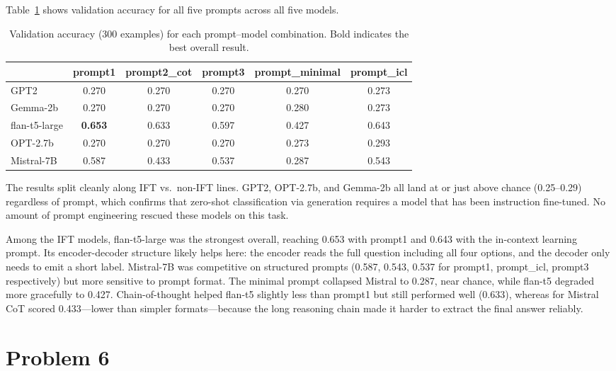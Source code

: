 \documentclass[11pt]{article}
\begin{document}
Table~\ref{tab:results} shows validation accuracy for all five prompts across all five models.

\begin{table}[h]
\centering
\small
\begin{tabular}{lccccc}
\toprule
 & \textbf{prompt1} & \textbf{prompt2\_cot} & \textbf{prompt3} & \textbf{prompt\_minimal} & \textbf{prompt\_icl} \\
\midrule
GPT2          & 0.270 & 0.270 & 0.270 & 0.270 & 0.273 \\
Gemma-2b      & 0.270 & 0.270 & 0.270 & 0.280 & 0.273 \\
flan-t5-large & \textbf{0.653} & 0.633 & 0.597 & 0.427 & 0.643 \\
OPT-2.7b      & 0.270 & 0.270 & 0.270 & 0.273 & 0.293 \\
Mistral-7B    & 0.587 & 0.433 & 0.537 & 0.287 & 0.543 \\
\bottomrule
\end{tabular}
\caption{Validation accuracy (300 examples) for each prompt--model combination. Bold indicates the best overall result.}
\label{tab:results}
\end{table}

The results split cleanly along IFT vs.\ non-IFT lines. GPT2, OPT-2.7b, and Gemma-2b all land at or just above chance (0.25--0.29) regardless of prompt, which confirms that zero-shot classification via generation requires a model that has been instruction fine-tuned. No amount of prompt engineering rescued these models on this task.

Among the IFT models, flan-t5-large was the strongest overall, reaching 0.653 with prompt1 and 0.643 with the in-context learning prompt. Its encoder-decoder structure likely helps here: the encoder reads the full question including all four options, and the decoder only needs to emit a short label. Mistral-7B was competitive on structured prompts (0.587, 0.543, 0.537 for prompt1, prompt\_icl, prompt3 respectively) but more sensitive to prompt format. The minimal prompt collapsed Mistral to 0.287, near chance, while flan-t5 degraded more gracefully to 0.427. Chain-of-thought helped flan-t5 slightly less than prompt1 but still performed well (0.633), whereas for Mistral CoT scored 0.433---lower than simpler formats---because the long reasoning chain made it harder to extract the final answer reliably.

\section*{Problem 6}
\end{document}
